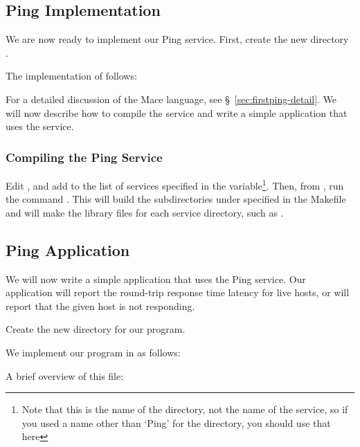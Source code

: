 \subsection{Ping Implementation}
\label{sec:first-ping-implementation}

We are now ready to implement our Ping service.  First, create the new
directory .

The implementation of  follows:



For a detailed discussion of the Mace language, see
\S~\ref{sec:firstping-detail}.  We will now describe how to
compile the service and write a simple application that uses the
service.

\subsubsection{Compiling the Ping Service}
\label{sec:compiling-ping-m}

Edit , and add  to
the list of services specified in the 
variable\footnote{Note that this is the name of the directory, not the
name of the service, so if you used a name other than `Ping' for the 
directory, you should use that here}.  Then, from , run the command
.  This will build the subdirectories under
 specified in the Makefile and will make the
library files for each service directory, such as .


\subsection{Ping Application}
\label{sec:first-ping-application}

We will now write a simple application that uses the Ping service.
Our application will report the round-trip response time latency for
live hosts, or will report that the given host is not responding.

Create the new directory  for our program.

We implement our program in  as
follows:


A brief overview of this file:


